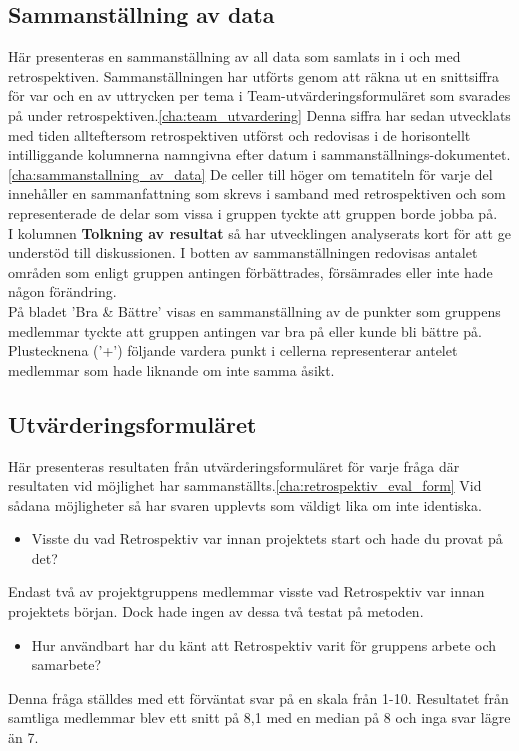 \subsection{Sammanställning av data}
\label{sec:johan_n-res-data}
Här presenteras en sammanställning av all data som samlats in i och med retrospektiven. Sammanställningen har utförts genom att räkna ut en snittsiffra för var och en av uttrycken per tema i Team-utvärderingsformuläret som svarades på under retrospektiven.\ref{cha:team_utvardering} Denna siffra har sedan utvecklats med tiden allteftersom retrospektiven utförst och redovisas i de horisontellt intilliggande kolumnerna namngivna efter datum i sammanställnings-dokumentet.\ref{cha:sammanstallning_av_data} De celler till höger om tematiteln för varje del innehåller en sammanfattning som skrevs i samband med retrospektiven och som representerade de delar som vissa i gruppen tyckte att gruppen borde jobba på.\\ I kolumnen \textbf{Tolkning av resultat} så har utvecklingen analyserats kort för att ge understöd till diskussionen. I botten av sammanställningen redovisas antalet områden som enligt gruppen antingen förbättrades, försämrades eller inte hade någon förändring.\\På bladet 'Bra \& Bättre' visas en sammanställning av de punkter som gruppens medlemmar tyckte att gruppen antingen var bra på eller kunde bli bättre på. Plustecknena ('+') följande vardera punkt i cellerna representerar antelet medlemmar som hade liknande om inte samma åsikt.


\subsection{Utvärderingsformuläret}
\label{sec:johan_n-res-form}
Här presenteras resultaten från utvärderingsformuläret för varje fråga där resultaten vid möjlighet har sammanställts.\ref{cha:retrospektiv_eval_form} Vid sådana möjligheter så har svaren upplevts som väldigt lika om inte identiska.
\begin{itemize}
\item Visste du vad Retrospektiv var innan projektets start och hade du provat på det?
\end{itemize}
Endast två av projektgruppens medlemmar visste vad Retrospektiv var innan projektets början. Dock hade ingen av dessa två testat på metoden.

\begin{itemize}
\item Hur användbart har du känt att Retrospektiv varit för gruppens arbete och samarbete?
\end{itemize}
Denna fråga ställdes med ett förväntat svar på en skala från 1-10.
Resultatet från samtliga medlemmar blev ett snitt på 8,1 med en median på 8 och inga svar lägre än 7.


